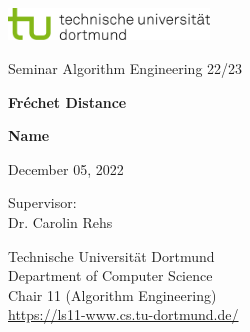 \begin{titlepage}
    \includegraphics[width=0.4\textwidth]{images/tud_logo_rgb.jpg}

    \begin{center}
        \vspace{3.5cm} \LARGE Seminar Algorithm Engineering 22/23

        \vspace{0.5cm} \huge \textbf{Fréchet Distance}

        \vspace{5cm} \textbf{Name} %

        \vspace{0.25cm} \Large December 05, 2022
    \end{center}

    \vspace{5.2cm} \large \noindent Supervisor: \\
    Dr. Carolin Rehs
    
    \vspace{1cm} \noindent Technische Universität Dortmund \\
    Department of Computer Science \\
    Chair 11 (Algorithm Engineering) \\ 
    \url{https://ls11-www.cs.tu-dortmund.de/}

    
\end{titlepage}
